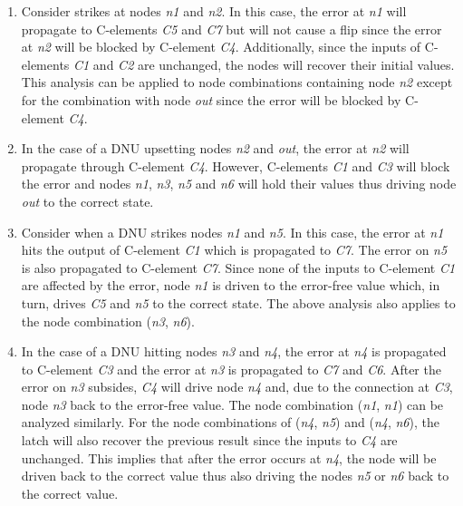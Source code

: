 \begin{enumerate}
	\item Consider strikes at nodes \textit{n1} and \textit{n2}. In this case, the error at \textit{n1} will propagate to C-elements \textit{C5} and \textit{C7} but will not cause a flip since the error at \textit{n2} will be blocked by C-element \textit{C4}. Additionally, since the inputs of C-elements \textit{C1} and \textit{C2} are unchanged, the nodes will recover their initial values. This analysis can be applied to node combinations containing node \textit{n2} except for the combination with node \textit{out} since the error will be blocked by C-element \textit{C4}.
	
	\item In the case of a DNU upsetting nodes \textit{n2} and \textit{out}, the error at \textit{n2} will propagate through C-element \textit{C4}. However, C-elements \textit{C1} and \textit{C3} will block the error and nodes \textit{n1}, \textit{n3}, \textit{n5} and \textit{n6} will hold their values thus driving node \textit{out} to the correct state. 

	\item Consider when a DNU strikes nodes \textit{n1} and \textit{n5}. In this case, the error at \textit{n1} hits the output of C-element \textit{C1} which is propagated to \textit{C7}. The error on \textit{n5} is also propagated to C-element \textit{C7}. Since none of the inputs to C-element \textit{C1} are affected by the error, node \textit{n1} is driven to the error-free value which, in turn, drives \textit{C5} and \textit{n5} to the correct state. The above analysis also applies to the node combination (\textit{n3}, \textit{n6}).

	\item In the case of a DNU hitting nodes \textit{n3} and \textit{n4}, the error at \textit{n4} is propagated to C-element \textit{C3} and the error at \textit{n3} is propagated to \textit{C7} and \textit{C6}. After the error on \textit{n3} subsides, \textit{C4} will drive node \textit{n4} and, due to the connection at \textit{C3}, node \textit{n3} back to the error-free value. The node combination (\textit{n1}, \textit{n1}) can be analyzed similarly. For the node combinations of (\textit{n4}, \textit{n5}) and (\textit{n4}, \textit{n6}), the latch will also recover the previous result since the inputs to \textit{C4} are unchanged. This implies that after the error occurs at \textit{n4}, the node will be driven back to the correct value thus also driving the nodes \textit{n5} or \textit{n6} back to the correct value.
	

\end{enumerate}
